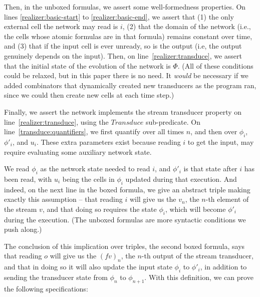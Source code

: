\documentclass[preprint,natbib]{sigplanconf}
\begin{document}
Then, in the unboxed formulas, we assert some well-formedness
properties. On lines \ref{realizer:basic-start} to
\ref{realizer:basic-end}, we assert that (1) the only external cell
the network may read is $i$, (2) that the domain of the network (i.e.,
the cells whose atomic formulas are in that formula) remains constant
over time, and (3) that if the input cell is ever unready, so is the
output (i.e, the output genuinely depends on the input). Then, on
line~\ref{realizer:transduce}, we assert that the initial state of the
evolution of the network is $\Phi$.  (All of these conditions could be
relaxed, but in this paper there is no need. It \emph{would}
be necessary if we added combinators that dynamically created new
transducers as the program ran, since we could then create new cells
at each time step.)

Finally, we assert the network implements the stream transducer 
property on line~\ref{realizer:transduce}, using the $\mathit{Transduce}$
sub-predicate. On line~\ref{transduce:quantifiers}, we first quantify
over all times $n$, and then over $\phi_i$, $\phi'_i$, and
$u_i$. These extra parameters exist because reading $i$ to get the
input, may require evaluating some auxiliary network state. 

We read $\phi_i$ as the network state needed to read $i$, and $\phi'_i$ is
that state after $i$ has been read, with $u_i$ being the cells in
$\phi_i$ updated during that execution.  And indeed, on the next line
in the boxed formula, we give an abstract triple making exactly this
assumption -- that reading $i$ will give us the $v_n$, the $n$-th
element of the stream $v$, and that doing so requires the state
$\phi_i$, which will become $\phi'_i$ during the execution. (The
unboxed formulas are more syntactic conditions we push along.)

The conclusion of this implication over triples, the second
boxed formula, says that reading $o$ will give us the $(f v)_n$, the
$n$-th output of the stream transducer, and that in doing so it will 
also update the input state $\phi_i$ to $\phi'_i$, in addition to 
sending the transducer state from $\phi_n$ to $\phi_{n+1}$. 
With this definition, we can prove the following specifications: 
\end{document}
